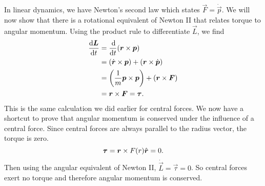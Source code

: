 \documentclass[../classical_mechanics.tex]{subfiles}
\begin{document}
        In linear dynamics, we have Newton's second law which states $\vec{F}=\dot{\vec{p}}$.
        We will now show that there is a rotational equivalent of Newton II that relates torque to angular momentum.
        Using the product rule to differentiate $\vec{L}$, we find
        \begin{align}
            \dv{\vec{L}}{t}&=\dv{}{t}(\vec{r}\times\vec{p})\\
            &=(\dot{\vec{r}}\times\vec{p})+(\vec{r}\times\dot{\vec{p}})\\
            &=\left(\frac{1}{m}\vec{p}\times\vec{p}\right)+(\vec{r}\times\vec{F})\\
            &=\vec{r}\times\vec{F}=\vec{\tau}.
        \end{align}
        This is the same calculation we did earlier for central forces.
        We now have a shortcut to prove that angular momentum is conserved under the influence of a central force.
        Since central forces are always parallel to the radius vector, the torque is zero.
        \begin{equation}
            \boldsymbol{\tau}=\boldsymbol{r}\times F(r)\hat{\boldsymbol{r}}=0.
        \end{equation}
        Then using the angular equivalent of Newton II, $\dot{\vec{L}}=\vec{\tau}=0$.
        So central forces exert no torque and therefore angular momentum is conserved.
\end{document}
